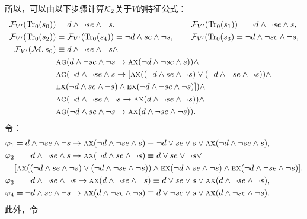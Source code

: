 \begin{example}
	
	所以，可以由以下步骤计算${\cal K}_2$关于$V$的特征公式：
	\begin{align*}
		{\cal F}_{V'}(\textrm{Tr}_0(s_0)) &= d \wedge \neg se \wedge \neg s, \qquad \qquad \qquad \qquad \quad {\cal F}_{V'}(\textrm{Tr}_0(s_1)) = \neg d \wedge \neg se \wedge s, \\
		{\cal F}_{V'} (\textrm{Tr}_0(s_2)) &= {\cal F}_{V'} (\textrm{Tr}_0(s_4)) = \neg d \wedge se \wedge \neg s,  \qquad  {\cal F}_{V'}(\textrm{Tr}_0(s_3) = \neg d \wedge \neg se\wedge \neg s,\\
		{\cal F}_{V'}({\cal M}, s_0)& \equiv d \wedge \neg se \wedge \neg s \wedge \\
		& \textsc{a} \textsc{g}(d \wedge \neg se \wedge \neg s \rightarrow \textsc{a}\textsc{x}(\neg d \wedge \neg se \wedge s))\wedge \\
		& \textsc{a} \textsc{g}(\neg d \wedge \neg se \wedge s \rightarrow [\textsc{a}\textsc{x}((\neg d \wedge se \wedge \neg s) \vee (\neg d \wedge \neg se\wedge \neg s)) \wedge\\ &\textsc{e}\textsc{x}(\neg d \wedge se \wedge \neg s) \wedge \textsc{e}\textsc{x} (\neg d \wedge \neg se\wedge \neg s)]) \wedge\\
		& \textsc{a} \textsc{g}(\neg d \wedge \neg se\wedge \neg s \rightarrow \textsc{a}\textsc{x}(d \wedge \neg se \wedge \neg s)) \wedge\\
		& \textsc{a} \textsc{g}(\neg d \wedge se \wedge \neg s \rightarrow \textsc{a}\textsc{x}(d \wedge \neg se \wedge \neg s)).
	\end{align*}
	令：
	\begin{align*}
		\varphi_1&  = d \wedge \neg se \wedge \neg s \rightarrow \textsc{a}\textsc{x}(\neg d \wedge \neg se \wedge s)\equiv \neg d \vee se \vee s \vee \textsc{a}\textsc{x}(\neg d \wedge \neg se \wedge s),\\
		\varphi_2& = \neg d \wedge \neg se \wedge s \rightarrow \textsc{a}\textsc{x}(\neg d \wedge se \wedge \neg s) \equiv d \vee  se \vee \neg s \vee\\
		& [\textsc{a}\textsc{x}((\neg d \wedge se \wedge \neg s) \vee (\neg d \wedge \neg se\wedge \neg s)) \wedge\textsc{e}\textsc{x}(\neg d \wedge se \wedge \neg s) \wedge \textsc{e}\textsc{x} (\neg d \wedge \neg se\wedge \neg s)],\\
		\varphi_3 &=\neg d \wedge \neg se\wedge \neg s \rightarrow \textsc{a}\textsc{x}(d \wedge \neg se \wedge \neg s)\equiv d \vee se \vee s \vee \textsc{a}\textsc{x}(d \wedge \neg se \wedge \neg s),\\
		\varphi_4 &= \neg d \wedge se \wedge \neg s \rightarrow \textsc{a}\textsc{x}(d \wedge \neg se \wedge \neg s)\equiv d \vee \neg se \vee s \vee \textsc{a}\textsc{x}(d \wedge \neg se \wedge \neg s).
	\end{align*}
	此外，令
	\begin{align*}

\end{align*}
\end{example}
